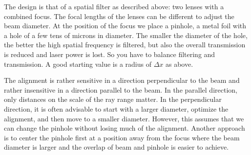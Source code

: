 The design is that of a spatial filter as described above: two lenses with a combined focus. The focal lengths of the lenses can be different to adjust the beam diameter. At the position of the focus we place a pinhole, a metal foil with a hole of a few tens of microns in diameter. The smaller the diameter of the hole, the better the high spatial frequency is filtered, but also the overall transmission is reduced and laser power is lost. So you have to balance filtering and transmission. A good starting value is a radius of $\Delta x$ as above.

The alignment is rather sensitive in a direction perpendicular to the beam and rather insensitive in a direction parallel to the beam. In the parallel direction, only distances on the scale of the ray range matter. In the perpendicular direction, it is often advisable to start with a larger diameter, optimize the alignment, and then move to a smaller diameter. However, this assumes that we can change the pinhole without losing much of the alignment. Another approach is to center the pinhole first at a position away from the focus where the beam diameter is larger and the overlap of beam and pinhole is easier to achieve.


\printbibliography[segment=\therefsegment,heading=subbibliography]
